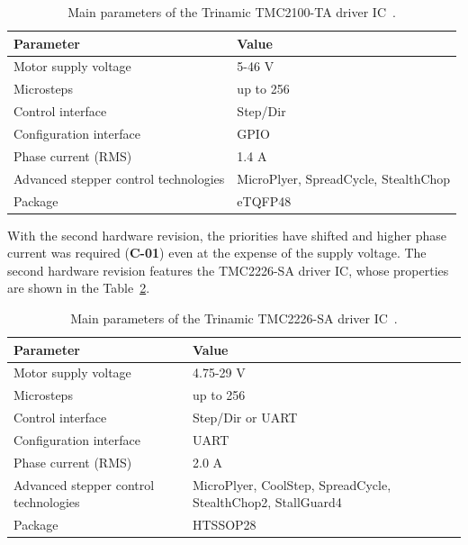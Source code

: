 \begin{table}[H]
    \centering
    \begin{tabular}{ |p{5cm}|p{7cm}| }
        \hline
        Parameter & Value \\
        \hline
        \hline
        Motor supply voltage & 5-46 V \\
        \hline
        Microsteps & up to 256 \\
        \hline
        Control interface & Step/Dir \\
        \hline
        Configuration interface & GPIO \\
        \hline
        Phase current (RMS) & 1.4 A \\
        \hline
        Advanced stepper control technologies & MicroPlyer, SpreadCycle, StealthChop \\
        \hline
        Package & eTQFP48 \\
        \hline
    \end{tabular}
    \caption{Main parameters of the Trinamic TMC2100-TA driver IC~\cite{noauthor_tmc2100_nodate}.}
    \label{tab:tmc2100_param}
\end{table}


With the second hardware revision, the priorities have shifted and higher phase current was required (\textbf{C-01}) even at the expense of the supply voltage.
The second hardware revision features the TMC2226-SA driver IC, whose properties are shown in the Table~\ref{tab:tmc2226_param}.

\begin{table}[H]
    \centering
    \begin{tabular}{ |p{5cm}|p{7cm}| }
        \hline
        Parameter & Value \\
        \hline
        \hline
        Motor supply voltage & 4.75-29 V \\
        \hline
        Microsteps & up to 256 \\
        \hline
        Control interface & Step/Dir or UART \\
        \hline
        Configuration interface & UART \\
        \hline
        Phase current (RMS) & 2.0 A \\
        \hline
        Advanced stepper control technologies & MicroPlyer, CoolStep, SpreadCycle, StealthChop2, StallGuard4 \\
        \hline
        Package & HTSSOP28 \\
        \hline
    \end{tabular}
    \caption{Main parameters of the Trinamic TMC2226-SA driver IC~\cite{tmc_2226}.}
    \label{tab:tmc2226_param}
\end{table}


